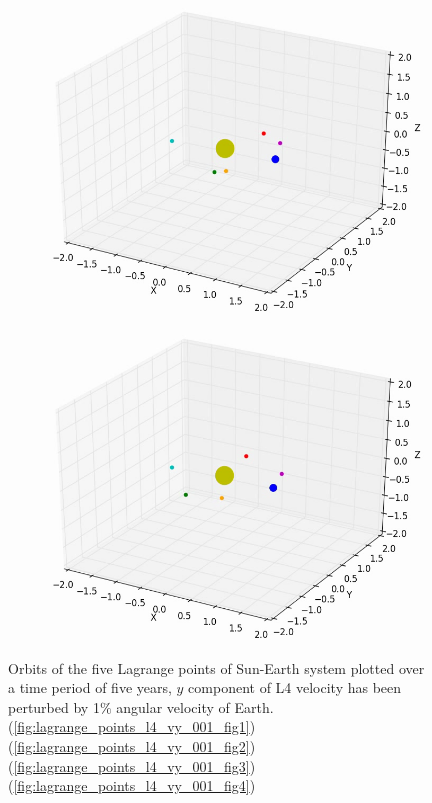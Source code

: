 \documentclass[10pt,letterpaper]{article}
\begin{document}
\begin{figure}[!htb]
  \includegraphics[width=\linewidth]{figures/lagrange_points/lagrange_points_l4_vy_001_3.png}
  \subcaption{}\label{fig:lagrange_points_l4_vy_001_fig3}
\endminipage
{}%
  \includegraphics[width=\linewidth]{figures/lagrange_points/lagrange_points_l4_vy_001_4.png}
  \subcaption{}\label{fig:lagrange_points_l4_vy_001_fig4}
\endminipage
\caption{Orbits of the five Lagrange points of Sun-Earth system plotted over a time period of five years, $y$ component of L4 velocity has been perturbed by 1$\%$ angular velocity of Earth.
(\ref{fig:lagrange_points_l4_vy_001_fig1}) 
(\ref{fig:lagrange_points_l4_vy_001_fig2}) 
(\ref{fig:lagrange_points_l4_vy_001_fig3}) 
(\ref{fig:lagrange_points_l4_vy_001_fig4})}\label{fig:lagrange_points_l4_vy_001}
\end{figure}
\end{document}
